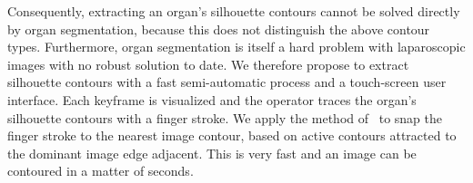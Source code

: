 Consequently, extracting an organ's silhouette contours cannot be solved directly by organ segmentation, because this does not distinguish the above contour types. Furthermore, organ segmentation is itself a hard problem with laparoscopic images with no robust solution to date. We therefore propose to extract silhouette contours with a fast semi-automatic process and a touch-screen user interface. Each keyframe is visualized and the operator traces the organ's silhouette contours with a finger stroke. We apply the method of~\cite{Mortensen95intelligentscissors} to snap the finger stroke to the nearest image contour, based on active contours attracted to the dominant image edge adjacent. This is very fast and an image can be contoured in a matter of seconds. %




